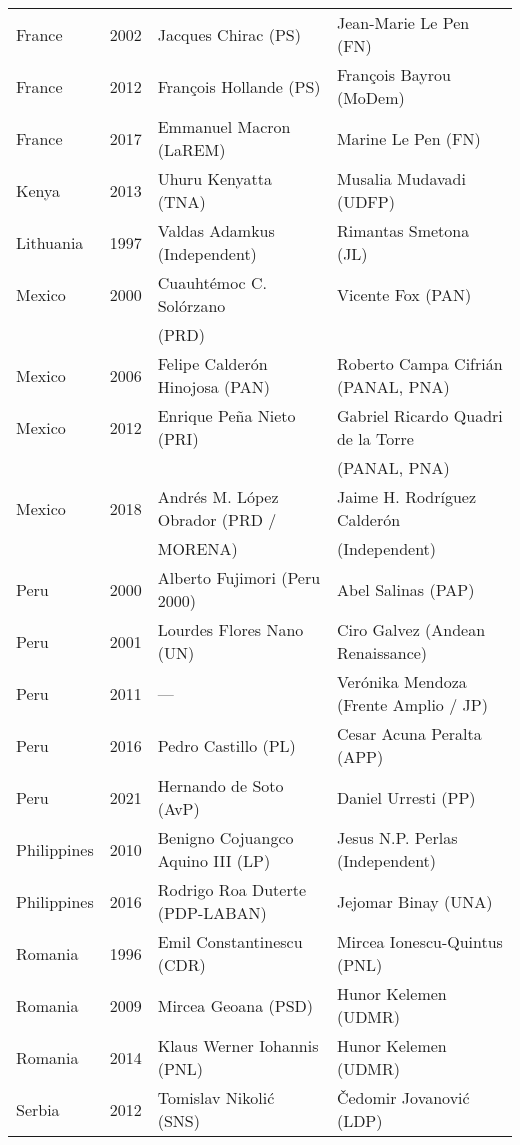 {\begin{longtable}{|l|c|l|l|}
France & 2002 & Jacques Chirac (PS) & Jean-Marie Le Pen (FN)\\ 
France & 2012 &   Fran\c{c}ois Hollande (PS)   &   Fran\c{c}ois Bayrou (MoDem)  \\ 
France & 2017 &   Emmanuel Macron (LaREM)    &   Marine Le Pen (FN) \\ 
Kenya     & 2013 &   Uhuru Kenyatta (TNA)    &  Musalia Mudavadi (UDFP)    \\ 
Lithuania & 1997 & Valdas Adamkus (Independent)      & Rimantas Smetona (JL)    \\ 
Mexico     & 2000 & Cuauht\'{e}moc C. Sol\'{o}rzano  & Vicente Fox (PAN)     \\ 
            &   &  (PRD) &    \\ 
 Mexico     & 2006 &  Felipe Calder\'on Hinojosa (PAN)   &  Roberto Campa Cifri\'an (PANAL, PNA) \\ 
 Mexico     & 2012 &   Enrique Pe\~na Nieto (PRI) & Gabriel Ricardo Quadri de la Torre   \\ 
             &  &    &   (PANAL, PNA) \\ 
 Mexico     & 2018 & Andr\'es M. L\'opez Obrador (PRD /   &  Jaime H. Rodr\'iguez Calder\'on   \\ 
      &   &  MORENA) &    (Independent)  \\ 
 Peru     & 2000 & Alberto Fujimori (Peru 2000) & Abel Salinas (PAP)           \\ 
 Peru     & 2001 & Lourdes Flores Nano (UN)    &   Ciro Galvez (Andean Renaissance)      \\ 
 Peru     & 2011 &  --- &  Ver\'onika Mendoza (Frente Amplio / JP)    \\ 
 Peru     & 2016 & Pedro Castillo (PL) &   Cesar Acuna Peralta (APP)  \\ 
 Peru     & 2021 & Hernando de Soto (AvP) &   Daniel Urresti (PP)  \\ 
 Philippines     & 2010 &  Benigno Cojuangco Aquino III (LP)  &  Jesus N.P. Perlas (Independent) \\ 
 Philippines     & 2016 & Rodrigo Roa Duterte (PDP-LABAN)           &  Jejomar Binay (UNA)     \\ 
 Romania     & 1996 & Emil Constantinescu (CDR) & Mircea Ionescu-Quintus (PNL)             \\ 
 Romania & 2009 & Mircea Geoana (PSD) &   Hunor Kelemen (UDMR)  \\ 
 Romania & 2014 &   Klaus Werner Iohannis (PNL)    &   Hunor Kelemen (UDMR)    \\ 
 Serbia     & 2012 &   Tomislav Nikoli\'c (SNS)         &  \v{C}edomir Jovanovi\'c (LDP)     \\ 

\end{longtable}}
